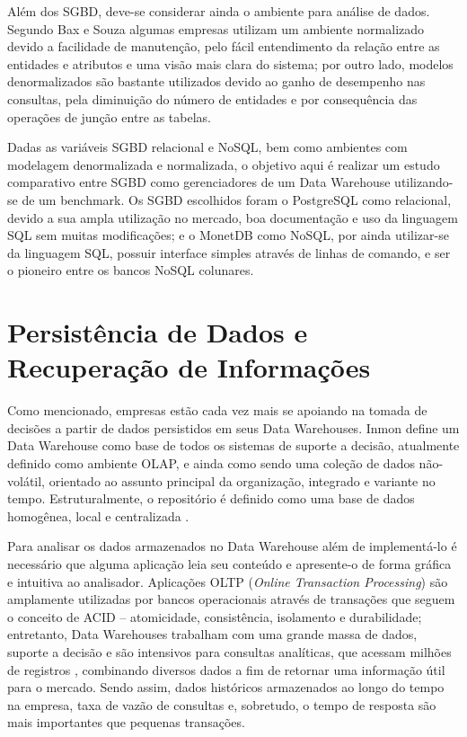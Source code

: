 \documentclass[conference]{IEEEtran}
\begin{document}
Além dos SGBD, deve-se considerar ainda o ambiente para análise de dados. Segundo Bax e Souza \cite{bax2003modelagem} algumas empresas utilizam um ambiente normalizado devido a facilidade de manutenção, pelo fácil entendimento da relação entre as entidades e atributos e uma visão mais clara do sistema; por outro lado, modelos denormalizados são bastante utilizados devido ao ganho de desempenho nas consultas, pela diminuição do número de entidades e por consequência das operações de junção entre as tabelas.

Dadas as variáveis SGBD relacional e NoSQL, bem como ambientes com modelagem denormalizada e normalizada, o objetivo aqui é realizar um estudo comparativo entre SGBD como gerenciadores de um Data Warehouse utilizando-se de um benchmark. Os SGBD escolhidos foram o PostgreSQL como relacional, devido a sua ampla utilização no mercado, boa documentação e uso da linguagem SQL sem muitas modificações; e o MonetDB como NoSQL, por ainda utilizar-se da linguagem SQL, possuir interface simples através de linhas de comando, e ser o pioneiro entre os bancos NoSQL colunares.

\section{Persistência de Dados e Recuperação de Informações}

Como mencionado, empresas estão cada vez mais se apoiando na tomada de decisões a partir de dados persistidos em seus Data Warehouses. Inmon \cite{inmon2005building} define um Data Warehouse como base de todos os sistemas de suporte a decisão, atualmente definido como ambiente OLAP, e ainda como sendo uma coleção de dados não-volátil, orientado ao assunto principal da organização, integrado e variante no tempo. Estruturalmente, o repositório é definido como uma base de dados homogênea, local e centralizada \cite{wrembel2007data}.

Para analisar os dados armazenados no Data Warehouse além de implementá-lo é necessário que alguma aplicação leia seu conteúdo e apresente-o de forma gráfica e intuitiva ao analisador. Aplicações OLTP (\textit{Online Transaction Processing}) são amplamente utilizadas por bancos operacionais através de transações que seguem o conceito de ACID -- atomicidade, consistência, isolamento e durabilidade; entretanto, Data Warehouses trabalham com uma grande massa de dados, suporte a decisão e são intensivos para consultas analíticas, que acessam milhões de registros \cite{chaudhuri1997overview}, combinando diversos dados a fim de retornar uma informação útil para o mercado. Sendo assim, dados históricos armazenados ao longo do tempo na empresa, taxa de vazão de consultas e, sobretudo, o tempo de resposta são mais importantes que pequenas transações. 
\end{document}
